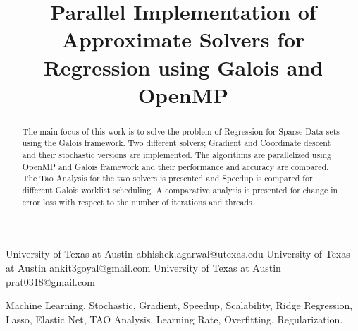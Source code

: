 \documentclass{sigplanconf}
\begin{document}
\setlength{\pdfpageheight}{\paperheight}
\setlength{\pdfpagewidth}{\paperwidth}


\doi{}





\title{Parallel Implementation of Approximate Solvers for Regression using Galois and OpenMP}

           {University of Texas at Austin}
           {abhishek.agarwal@utexas.edu}
           {University of Texas at Austin}
           {ankit3goyal@gmail.com}
           {University of Texas at Austin}
           {prat0318@gmail.com}

\maketitle

\begin{abstract}
The main focus of this work is to solve the problem of Regression for Sparse Data-sets using the Galois framework.
Two different solvers; Gradient and Coordinate descent and their stochastic versions are implemented. The
algorithms are parallelized using OpenMP and Galois framework and their performance and accuracy are compared.
The Tao Analysis for the two solvers is presented and Speedup is compared for different Galois worklist scheduling. A
comparative analysis is presented for change in error loss with respect to the number of iterations and threads. 
\end{abstract}


\keywords
Machine Learning, Stochastic, Gradient, Speedup, Scalability, Ridge Regression, Lasso, Elastic Net, TAO Analysis, Learning Rate, Overfitting, 
Regularization.
\end{document}
